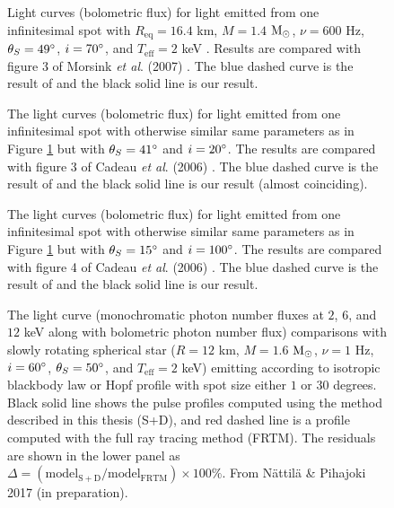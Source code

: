 \documentclass{wihuri}
\def\msun{{\rm M_{\odot}}}
\def\thetas{\theta_{S}}
\def\req{R_{\mathrm{eq}}}
\begin{document}
\begin{figure}[!ht]
\centerline{}
\caption{Light curves (bolometric flux) for light emitted from one infinitesimal spot with $\req = 16.4$ km, $M = 1.4$ $\msun$, $\nu = 600$ Hz, $\thetas = 49 \degree$, $i = 70 \degree$, and $T_{\mathrm{eff}} = 2$ keV . Results are compared with figure 3 of Morsink {\it et al}. (2007) \cite{morsink}. The blue dashed curve is the result of \cite{morsink} and the black solid line is our result.
\label{fig:mor3}}
\end{figure}

\begin{figure}[!ht]
\centerline{}
\caption{The light curves (bolometric flux) for light emitted from one infinitesimal spot with otherwise similar same parameters as in Figure \ref{fig:mor3} but with $\thetas = 41 \degree$ and $i = 20 \degree$. The results are compared with figure 3 of Cadeau {\it et al}. (2006) \cite{cadeau}. The blue dashed curve is the result of \cite{cadeau} and the black solid line is our result (almost coinciding).
\label{fig:cad3}}
\end{figure}


\begin{figure}[!ht]
\centerline{}
\caption{The light curves (bolometric flux) for light emitted from one infinitesimal spot with otherwise similar same parameters as in Figure \ref{fig:mor3} but with $\thetas = 15 \degree$ and $i = 100 \degree$. The results are compared with figure 4 of Cadeau {\it et al}. (2006) \cite{cadeau}. The blue dashed curve is the result of \cite{cadeau} and the black solid line is our result.
\label{fig:cad4}}
\end{figure}



\begin{figure}
\centerline{}
\caption{The light curve (monochromatic photon number fluxes at $2$, $6$, and $12$ keV along with bolometric photon number flux) comparisons with slowly rotating spherical star ($R = 12$ km, $M = 1.6$ $\msun$, $\nu = 1$ Hz, $i = 60 \degree$, $\thetas = 50 \degree$, and $T_{\mathrm{eff}} = 2$ keV) emitting according to isotropic blackbody law or Hopf profile with spot size either $1$ or $30$ degrees. Black solid line shows the pulse profiles computed using the method described in this thesis (S+D), and red dashed line is a profile computed with the full ray tracing method (FRTM). The residuals are shown in the lower panel as $\Delta = (\mathrm{model}_{\mathrm{S+D}}/\mathrm{model}_{\mathrm{FRTM}})\times100\%$. From Nättilä \& Pihajoki 2017 (in preparation).
\label{fig:jpulse1}}
\end{figure}
\end{document}
